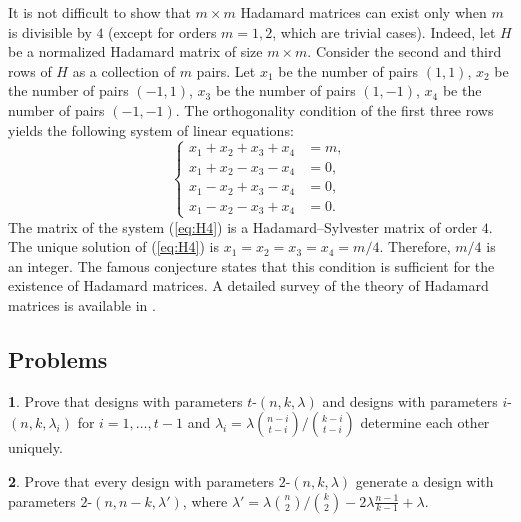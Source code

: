 \documentclass[11pt]{article}
\theoremstyle{definition}
\newtheorem{exercise}{\quad}
\begin{document}
{{{It is not difficult to show that $m\times m$ Hadamard matrices can exist only when $m$ is divisible by $4$
(except for orders $m=1, 2$, which are trivial cases). 
Indeed, let $H$ be a normalized Hadamard  matrix of size $m\times m$. Consider the  second and third rows of $H$ as a collection of $m$ pairs. Let  $x_1$ be the number of pairs  $(1,1)$, $x_2$ be the number of pairs  $(-1,1)$, $x_3$ be the number of pairs  $(1,-1)$, $x_4$ be the number of pairs  $(-1,-1)$. The orthogonality condition of the first three rows yields the following system of linear equations:
\begin{equation}\label{eq:H4}
  \left\{
    \begin{aligned}
      x_1 + x_2 + x_3 + x_4 &= m,\\
      x_1 + x_2 - x_3 - x_4 &= 0,\\
       x_1 - x_2 + x_3- x_4 &= 0,\\
        x_1 - x_2 - x_3 + x_4 &= 0.
    \end{aligned}
  \right.
\end{equation}
The matrix of the system (\ref{eq:H4}) is a  Hadamard--Sylvester matrix of order $4$. The unique solution of  (\ref{eq:H4}) is $x_1=x_2=x_3=x_4=m/4$. Therefore, $m/4$ is an integer.
The famous conjecture states that this condition is sufficient for the existence of Hadamard matrices.
A detailed survey of the theory of Hadamard matrices is available in \cite{Horadam}. \label{Hprob}












\subsection{Problems}



\begin{exercise} Prove that  designs with parameters
$t$-$(n,k,\lambda)$ and designs with parameters
$i$-$(n,k,\lambda_i)$ for $i=1,\dots,t-1$ and $\lambda_i=\lambda{{n-i}
\choose {t-i}}/{{k-i} \choose {t-i}}$ determine each other uniquely.
\end{exercise}


\begin{exercise} Prove that every design with parameters
$2$-$(n,k,\lambda)$ generate a design with
parameters $2$-$(n,n-k,\lambda')$, where $\lambda'=\lambda{{n}
\choose {2}}/{{k} \choose {2}}- 2\lambda\frac{n-1}{k-1}+ \lambda$.
\end{exercise}

}}}
\end{document}
